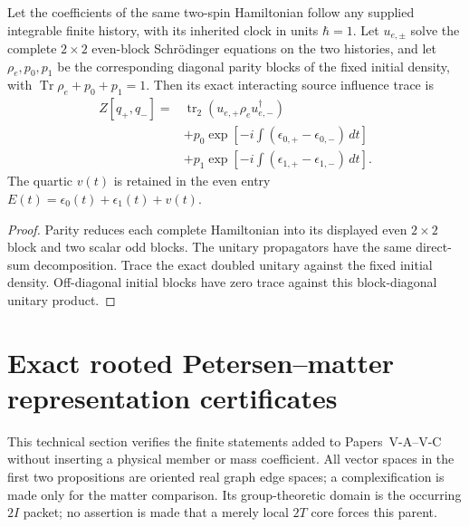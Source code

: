 \documentclass[11pt,a4paper]{article}
\begin{document}
\begin{proposition}
\label{p5c:prop:v248-paired-history-compiler}
Let the coefficients of the same two-spin Hamiltonian follow any
supplied integrable finite history, with its inherited clock in units
$\hbar=1$. Let $u_{e,\pm}$ solve the complete $2\times2$ even-block
Schr\"odinger equations on the two histories, and let
$\rho_e,p_0,p_1$ be the corresponding diagonal parity blocks of the
fixed initial density, with
$\operatorname{Tr}\rho_e+p_0+p_1=1$. Then its exact interacting
source influence trace is
\[
 \boxed{\begin{aligned}
 Z[q_+,q_-]={}&\operatorname{tr}_2
     (u_{e,+}\rho_eu_{e,-}^\dagger)\\
 &+p_0\exp\!\left[-i\int(\epsilon_{0,+}-\epsilon_{0,-})\,dt\right]\\
 &+p_1\exp\!\left[-i\int(\epsilon_{1,+}-\epsilon_{1,-})\,dt\right].
 \end{aligned}}
\]
The quartic $v(t)$ is retained in the even entry
$E(t)=\epsilon_0(t)+\epsilon_1(t)+v(t)$.
\end{proposition}
\begin{proof}
Parity reduces each complete Hamiltonian into its displayed even
$2\times2$ block and two scalar odd blocks. The unitary propagators
have the same direct-sum decomposition. Trace the exact doubled
unitary against the fixed initial density. Off-diagonal initial blocks
have zero trace against this block-diagonal unitary product.
\end{proof}


\section{Exact rooted Petersen--matter representation certificates}
\label{p5d:sec:v321-petersen-matter-certificate}

This technical section verifies the finite statements added to
Papers~V-A--V-C without inserting a physical member or mass coefficient.
All vector spaces in the first two propositions are oriented real graph
edge spaces; a complexification is made only for the matter comparison.
Its group-theoretic domain is the occurring $2I$ packet; no assertion is
made that a merely local $2T$ core forces this parent.
\end{document}
